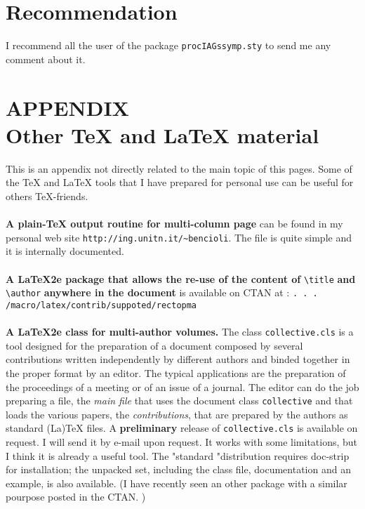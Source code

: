 \documentclass[a4paper,twocolumn,10pt]{article} %
\begin{document}
\section{Recommendation}
I recommend all the user of the package \texttt{procIAGssymp.sty}
to send me any comment about it. 
\vfill\eject
\section*{APPENDIX \\ Other \TeX{} and \LaTeX{} material}
This is an appendix not directly related to the main topic of this pages.
Some of the \TeX{} and \LaTeX{} tools that I have prepared 
for personal use can be useful for others \TeX-friends.
\paragraph{}\textbf{
A plain-TeX  output routine for multi-column page} can be found in my 
personal web site \texttt{http://ing.unitn.it/\~{}bencioli}.
The file is quite simple and it is internally documented.
\paragraph{}\textbf{
A \LaTeX2e package that allows the re-use of the content of} 
\verb+\title+  \textbf{
and} \verb+\author+\textbf{ anywhere in the document} is
available  on CTAN at :  
\texttt{. . . /macro/latex/contrib/suppoted/rectopma}
\paragraph{}\textbf{A \LaTeX2e class for multi-author volumes.} 
The  class \verb+collective.cls+ is a tool designed for the
preparation of a document composed by several contributions written
independently by different authors and binded together in the
proper format by an editor. The typical applications are 
the preparation of the proceedings of a meeting or of an issue 
of a journal.
The editor can do the job preparing a file, the {\em main file} 
that uses the document class  \verb+collective+ and that
loads the various papers, the {\em contributions}, that are prepared 
by the authors as standard (La)TeX files.  A \textbf{preliminary} 
release of  \verb+collective.cls+ is available on request. 
I will send it by e-mail upon request. It 
works with some limitations, but I think it is already a useful tool. 
The "standard "distribution  requires doc-strip for installation; the 
unpacked set, including the class file, documentation and an example, is 
also available. (I have recently seen an other package  with a similar 
pourpose posted in the CTAN. )
\end{document}
